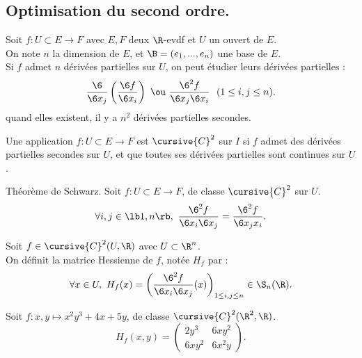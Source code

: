 \documentclass[11pt]{article}
\begin{document}
\subsection{Optimisation du second ordre.}

\begin{defi}{}{}
    Soit $f:U\subset E\to F$ avec $E,F$ deux $\R$-evdf et $U$ un ouvert de $E$.\\
    On note $n$ la dimension de $E$, et $\B=(e_1,...,e_n)$ une base de $E$.\\
    Si $f$ admet $n$ dérivées partielles sur $U$, on peut étudier leurs dérivées partielles :
    \begin{equation*}
        \frac{\6}{\6 x_j}\left( \frac{\6 f}{\6 x_i} \right) ~\ou~ \frac{\6^2f}{\6 x_j \6 x_i} ~~ (1 \leq i,j \leq n).
    \end{equation*}
    quand elles existent, il y a $n^2$ dérivées partielles secondes.
\end{defi}

\begin{defi}{}{}
    Une application $f:U\subset E\to F$ est $\cursive{C}^2$ sur $I$ si $f$ admet des dérivées partielles secondes sur $U$, et que toutes ses dérivées partielles sont continues sur $U$.
\end{defi}

\begin{prop}{Théorème de Schwarz.}{}
    Soit $f:U\subset E \to F$, de classe $\cursive{C}^2$ sur $U$.
    \begin{equation*}
        \forall i,j \in \lb1,n\rb, ~ \frac{\6^2 f}{\6 x_i \6 x_j} = \frac{\6^2 f}{\6 x_j x_i}.
    \end{equation*}
\end{prop}

\begin{defi}{}{}
    Soit $f\in\cursive{C}^2(U,\R)$ avec $U\subset\R^n$.\\
    On définit la matrice Hessienne de $f$, notée $H_f$ par :
    \begin{equation*}
        \forall x \in U, ~ H_f(x) = \left( \frac{\6^2 f}{\6 x_i \6 x_j}(x) \right)_{1 \leq i,j \leq n} \in \S_n(\R).
    \end{equation*}
\end{defi}

\begin{ex}{}{}
    Soit $f:x,y\mapsto x^2y^3 + 4x + 5y$, de classe $\cursive{C}^2(\R^2,\R)$.
    \begin{equation*}
        H_f(x,y) = \begin{pmatrix} 2y^3 & 6xy^2 \\ 6xy^2 & 6x^2y\end{pmatrix}.
    \end{equation*}
\end{ex}
\end{document}
